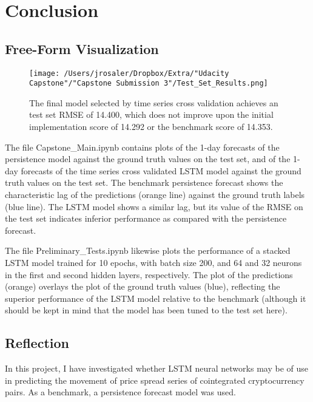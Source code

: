 \documentclass{article}
\begin{document}
\section{Conclusion}

\subsection{Free-Form Visualization}

\begin{figure}[]
\texttt{[image: /Users/jrosaler/Dropbox/Extra/"Udacity Capstone"/"Capstone Submission 3"/Test\_Set\_Results.png]}
\caption{The final model selected by time series cross validation achieves an test set RMSE of 14.400, which does not improve upon the initial implementation score of 14.292 or the benchmark score of 14.353.} 
\label{TestResults}
\end{figure}

The file Capstone\_Main.ipynb contains plots of the 1-day forecasts of the persistence model against the ground truth values on the test set, and of the 1-day forecasts of the time series cross validated LSTM model against the ground truth values on the test set. The benchmark persistence forecast shows the characteristic lag of the predictions (orange line) against the ground truth labels (blue line). The LSTM model shows a similar lag, but its value of the RMSE on the test set indicates inferior performance as compared with the persistence forecast. 

The file Preliminary\_Tests.ipynb likewise plots the performance of a stacked LSTM model trained for 10 epochs, with batch size 200, and 64 and 32 neurons in the first and second hidden layers, respectively. The plot of the predictions (orange) overlays the plot of the ground truth values (blue), reflecting the superior performance of the LSTM model relative to the benchmark (although it should be kept in mind that the model has been tuned to the test set here).


\subsection{Reflection}

In this project, I have investigated whether LSTM neural networks may be of use in predicting the movement of price spread series of cointegrated cryptocurrency pairs. As a benchmark, a persistence forecast model was used. 
\end{document}
